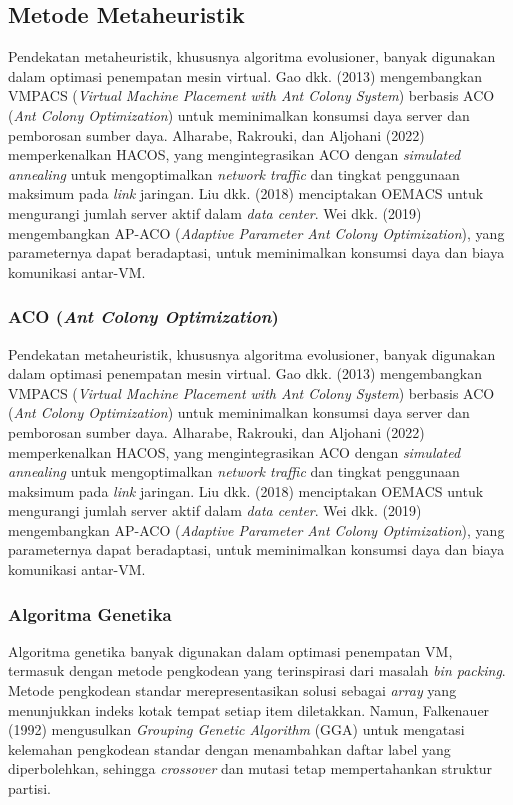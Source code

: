 \subsection{Metode Metaheuristik}
Pendekatan metaheuristik, khususnya algoritma evolusioner, banyak digunakan dalam optimasi penempatan mesin virtual. Gao dkk. (2013) mengembangkan VMPACS (\textit{Virtual Machine Placement with Ant Colony System}) berbasis ACO (\textit{Ant Colony Optimization}) untuk meminimalkan konsumsi daya server dan pemborosan sumber daya. Alharabe, Rakrouki, dan Aljohani (2022) memperkenalkan HACOS, yang mengintegrasikan ACO dengan \textit{simulated annealing} untuk mengoptimalkan \textit{network traffic} dan tingkat penggunaan maksimum pada \textit{link} jaringan. Liu dkk. (2018) menciptakan OEMACS untuk mengurangi jumlah server aktif dalam \textit{data center}. Wei dkk. (2019) mengembangkan AP-ACO (\textit{Adaptive Parameter Ant Colony Optimization}), yang parameternya dapat beradaptasi, untuk meminimalkan konsumsi daya dan biaya komunikasi antar-VM.


\subsubsection{ACO (\textit{Ant Colony Optimization})}
Pendekatan metaheuristik, khususnya algoritma evolusioner, banyak digunakan dalam optimasi penempatan mesin virtual. Gao dkk. (2013) mengembangkan VMPACS (\textit{Virtual Machine Placement with Ant Colony System}) berbasis ACO (\textit{Ant Colony Optimization}) untuk meminimalkan konsumsi daya server dan pemborosan sumber daya. Alharabe, Rakrouki, dan Aljohani (2022) memperkenalkan HACOS, yang mengintegrasikan ACO dengan \textit{simulated annealing} untuk mengoptimalkan \textit{network traffic} dan tingkat penggunaan maksimum pada \textit{link} jaringan. Liu dkk. (2018) menciptakan OEMACS untuk mengurangi jumlah server aktif dalam \textit{data center}. Wei dkk. (2019) mengembangkan AP-ACO (\textit{Adaptive Parameter Ant Colony Optimization}), yang parameternya dapat beradaptasi, untuk meminimalkan konsumsi daya dan biaya komunikasi antar-VM.


\subsubsection{Algoritma Genetika}
Algoritma genetika banyak digunakan dalam optimasi penempatan VM, termasuk dengan metode pengkodean yang terinspirasi dari masalah \textit{bin packing}. Metode pengkodean standar merepresentasikan solusi sebagai \textit{array} yang menunjukkan indeks kotak tempat setiap item diletakkan. Namun, Falkenauer (1992) mengusulkan \textit{Grouping Genetic Algorithm} (GGA) untuk mengatasi kelemahan pengkodean standar dengan menambahkan daftar label yang diperbolehkan, sehingga \textit{crossover} dan mutasi tetap mempertahankan struktur partisi.

